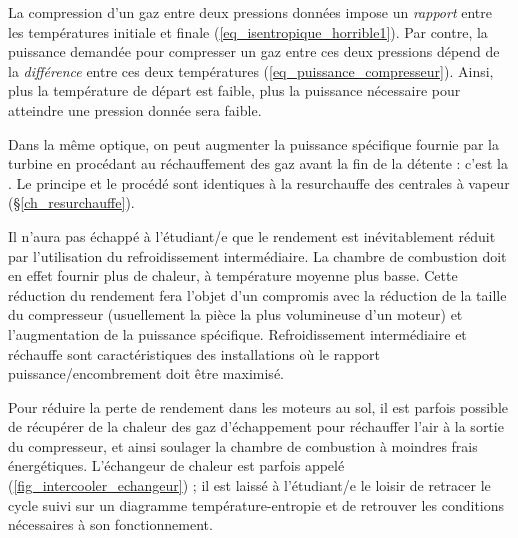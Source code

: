 		La compression d’un gaz entre deux pressions données impose un \emph{rapport} entre les températures initiale et finale (\ref{eq_isentropique_horrible1}). Par contre, la puissance demandée pour compresser un gaz entre ces deux pressions dépend de la \emph{différence} entre ces deux températures (\ref{eq_puissance_compresseur}). Ainsi, plus la température de départ est faible, plus la puissance nécessaire pour atteindre une pression donnée sera faible.

		Dans la même optique, on peut augmenter la puissance spécifique fournie par la turbine en procédant au réchauffement des gaz avant la fin de la détente : c’est la . Le principe et le procédé sont identiques à la resurchauffe des centrales à vapeur (\S\ref{ch_resurchauffe}).

		Il n’aura pas échappé à l’étudiant/e que le rendement est inévitablement réduit par l’utilisation du refroidissement intermédiaire. La chambre de combustion doit en effet fournir plus de chaleur, à température moyenne plus basse. Cette réduction du rendement fera l’objet d’un compromis avec la réduction de la taille du compresseur (usuellement la pièce la plus volumineuse d’un moteur) et l’augmentation de la puissance spécifique. Refroidissement intermédiaire et réchauffe sont caractéristiques des installations où le rapport puissance/encombrement doit être maximisé.

		Pour réduire la perte de rendement dans les moteurs au sol, il est parfois possible de récupérer de la chaleur des gaz d’échappement pour réchauffer l’air à la sortie du compresseur, et ainsi soulager la chambre de combustion à moindres frais énergétiques. L’échangeur de chaleur est parfois appelé  (\cref{fig_intercooler_echangeur}) ; il est laissé à l’étudiant/e le loisir de retracer le cycle suivi sur un diagramme température-entropie et de retrouver les conditions nécessaires à son \mbox{fonctionnement}.
		

